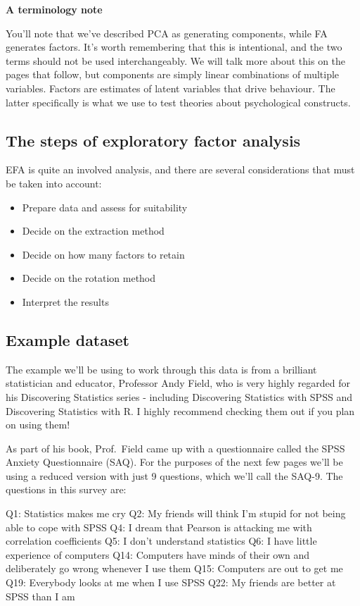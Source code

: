 \documentclass[
]{book}
\providecommand{\tightlist}{%
  \setlength{\itemsep}{0pt}\setlength{\parskip}{0pt}}
\begin{document}
\textbf{A terminology note}

You'll note that we've described PCA as generating components, while FA generates factors. It's worth remembering that this is intentional, and the two terms should not be used interchangeably. We will talk more about this on the pages that follow, but components are simply linear combinations of multiple variables. Factors are estimates of latent variables that drive behaviour. The latter specifically is what we use to test theories about psychological constructs.

\subsection{The steps of exploratory factor analysis}\label{the-steps-of-exploratory-factor-analysis}

EFA is quite an involved analysis, and there are several considerations that must be taken into account:

\begin{itemize}
\tightlist
\item
  Prepare data and assess for suitability
\item
  Decide on the extraction method
\item
  Decide on how many factors to retain
\item
  Decide on the rotation method
\item
  Interpret the results
\end{itemize}

\subsection{Example dataset}\label{example-dataset}

The example we'll be using to work through this data is from a brilliant statistician and educator, Professor Andy Field, who is very highly regarded for his Discovering Statistics series - including Discovering Statistics with SPSS and Discovering Statistics with R. I highly recommend checking them out if you plan on using them!

As part of his book, Prof.~Field came up with a questionnaire called the SPSS Anxiety Questionnaire (SAQ). For the purposes of the next few pages we'll be using a reduced version with just 9 questions, which we'll call the SAQ-9. The questions in this survey are:

Q1: Statistics makes me cry
Q2: My friends will think I'm stupid for not being able to cope with SPSS
Q4: I dream that Pearson is attacking me with correlation coefficients
Q5: I don't understand statistics
Q6: I have little experience of computers
Q14: Computers have minds of their own and deliberately go wrong whenever I use them
Q15: Computers are out to get me
Q19: Everybody looks at me when I use SPSS
Q22: My friends are better at SPSS than I am
\end{document}
